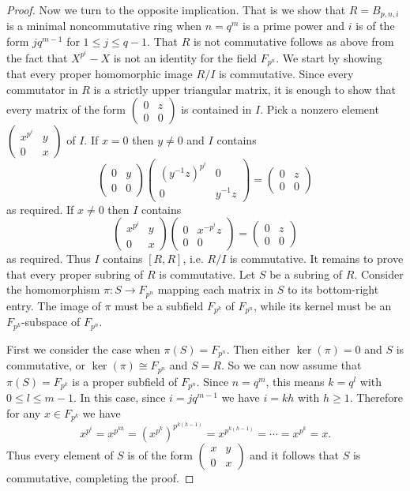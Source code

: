 \documentclass[10pt,a4paper]{amsart}
\begin{document}
\begin{proof}
Now we turn to the opposite implication. That is we show that $R=B_{p,n,i}$ is a minimal noncommutative ring when $n=q^m$ is a prime power and $i$ is of the form $jq^{m-1}$ for $1\leq j\leq q-1$. That $R$ is not commutative follows as above from the fact that $X^{p^i}-X$ is not an identity for the field $F_{p^n}$. We start by showing that every proper homomorphic image $R/I$ is commutative. Since every commutator in $R$ is a strictly upper triangular matrix, it is enough to show that every matrix of the form $\begin{pmatrix}
0&z\\
0&0
\end{pmatrix}$ is contained in $I$. Pick a nonzero element $\begin{pmatrix}
x^{p^i}&y\\
0&x
\end{pmatrix}$ of $I$. If $x=0$ then $y\neq 0$ and $I$ contains
\[\begin{pmatrix}
0&y\\
0&0
\end{pmatrix}\begin{pmatrix}
\left(y^{-1}z\right)^{p^i}&0\\
0&y^{-1}z
\end{pmatrix}=\begin{pmatrix}
0&z\\
0&0
\end{pmatrix}\]
as required. If $x\neq 0$ then $I$ contains
\[\begin{pmatrix}
x^{p^i}&y\\
0&x
\end{pmatrix}\begin{pmatrix}
0&x^{-p^i}z\\
0&0
\end{pmatrix}=\begin{pmatrix}
0&z\\
0&0
\end{pmatrix}\]
as required. Thus $I$ contains $[R,R]$, i.e. $R/I$ is commutative. It remains to prove that every proper subring of $R$ is commutative. Let $S$ be a subring of $R$. Consider the homomorphism $\pi:S\to F_{p^n}$ mapping each matrix in $S$ to its bottom-right entry. The image of $\pi$ must be a subfield $F_{p^k}$ of $F_{p^n}$, while its kernel must be an $F_{p^k}$-subspace of $F_{p^n}$.

First we consider the case when $\pi(S)=F_{p^n}$. Then either $\ker(\pi)=0$ and $S$ is commutative, or $\ker(\pi)\cong F_{p^n}$ and $S=R$. So we can now assume that $\pi(S)=F_{p^k}$ is a proper subfield of $F_{p^n}$. Since $n=q^m$, this means $k=q^l$ with $0\leq l\leq m-1$. In this case, since $i=jq^{m-1}$ we have $i=kh$ with $h\geq 1$. Therefore for any $x\in F_{p^k}$ we have
\[x^{p^i}=x^{p^{kh}}=\left(x^{p^k}\right)^{p^{k(h-1)}}=x^{p^{k(h-1)}}=\cdots=x^{p^k}=x.\]
Thus every element of $S$ is of the form $\begin{pmatrix}
x&y\\
0&x
\end{pmatrix}$ and it follows that $S$ is commutative, completing the proof.
\end{proof}
\end{document}
